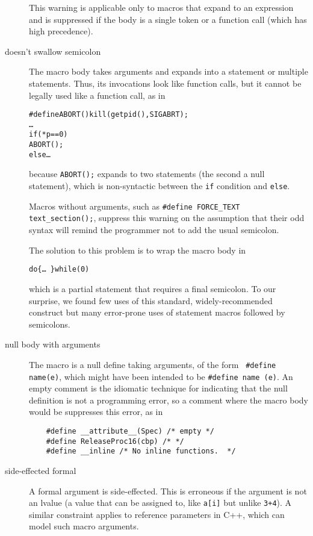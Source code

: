 \documentclass[10pt]{article}
\begin{document}
\begin{description}
        This warning is applicable only to macros that expand to an
        expression and is suppressed if the body is a single token or a
        function call (which has high precedence).

\item[doesn't swallow semicolon]\label{item:swallow-semicolon}
        The macro body takes arguments and expands into a statement or
        multiple statements.  Thus, its invocations look like function
        calls, but it cannot be legally used like a function call, as in
\begin{alltt}
    #define ABORT() kill(getpid(),SIGABRT);
    \ldots
    if (*p == 0)
      ABORT();
    else \ldots
\end{alltt}
        because {\tt ABORT();} expands to two statements (the second a null
        statement), which is non-syntactic between the {\tt if} condition and
        {\tt else}.

        Macros without arguments, such as {\tt \#define \verb|FORCE_TEXT|
        \verb|text_section|();}, suppress this warning on the assumption that their
        odd syntax will remind the programmer not to add the usual semicolon.

        The solution to this problem is to wrap the macro body in
\begin{alltt}
             do \verb|{| \ldots\ \verb|}| while (0)
\end{alltt}
        which is a partial statement that requires a final semicolon.  To
        our surprise, we found few uses of this standard, widely-recommended
        construct but many error-prone uses of statement macros followed by
        semicolons.

\item[null body with arguments]
        The macro is a null define taking arguments, of the form {\tt
        \#define name(e)},
        which might have been intended to be {\tt \#define name (e)}.
        An empty comment is the idiomatic technique for indicating that the
        null definition is not a programming error, so a comment where the macro
        body would be suppresses this error, as in
\begin{verbatim}
    #define __attribute__(Spec) /* empty */
    #define ReleaseProc16(cbp) /* */
    #define __inline /* No inline functions.  */
\end{verbatim}

\item[side-effected formal]
        A formal argument is side-effected.  This is erroneous if the
        argument is not an lvalue (a value that can be assigned to, like
        {\tt a[i]} but unlike {\tt 3+4}).  A similar constraint applies to
        reference parameters in C++, which can model such macro arguments.


\end{description}
\end{document}

